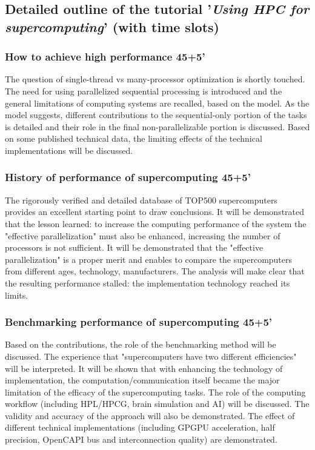 \documentclass[preprint,12pt,authoryear]{article}
\begin{document}
	    

\subsection{Detailed outline of the tutorial '\textit{Using HPC for 	supercomputing}' (with time slots)}

		\subsubsection{How to achieve high performance 45+5'}
  		The question of single-thread vs many-processor optimization
  		is shortly touched.
  		The need for using parallelized sequential processing is introduced
  		and the general limitations of computing systems are recalled, 
  		based on the model. As the model suggests, different contributions
  		to the sequential-only portion of the tasks is detailed
  		and their role in the final non-parallelizable portion is discussed.
  		 Based on some published technical data,
  		the limiting effects of the technical implementations will be discussed.
  		
		\subsubsection{History of performance of supercomputing 45+5'}
  		The rigorously verified and detailed database of TOP500 supercomputers
  		provides an excellent starting point to draw conclusions.
  		It will be demonstrated that the lesson learned: to increase
  		the computing performance of the system the "effective parallelization" must also be enhanced, increasing the number of
  		processors is not sufficient. It will be demonstrated that
  		the "effective parallelization" is a proper merit and enables
  		to compare the supercomputers from different ages, technology, manufacturers. The analysis will make clear that 
  		the resulting performance stalled: the implementation technology 
  		reached its limits.
  		
		\subsubsection{Benchmarking performance of supercomputing 45+5'}
		Based on the contributions, the role of the benchmarking
		method will be discussed. The experience that "supercomputers have
		two different efficiencies" will be interpreted. It will be shown
		that with enhancing the technology of implementation,
		the computation/communication itself became the major limitation of the efficacy of the supercomputing tasks. The role of the computing workflow (including HPL/HPCG, brain simulation and AI) will be discussed.
		The validity and accuracy of the approach 
		will also be demonstrated. The effect of different technical implementations
		(including GPGPU acceleration, half precision, OpenCAPI bus and interconnection quality) are demonstrated. 
		
\end{document}
